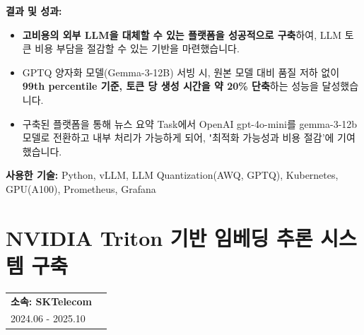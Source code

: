 \documentclass[letterpaper,11pt]{article}
\makeatletter
\newcommand{\resumeProject}[2]{
  \vspace{-1pt}\item
    \begin{tabular*}{0.97\textwidth}[t]{l@{\extracolsep{\fill}}r}
      \textbf{#1} \\
      \small{#2} \\
    \end{tabular*}\vspace{-5pt}
}
\makeatother
\begin{document}
{      %
      \textbf{결과 및 성과:}
      \begin{itemize}[leftmargin=*]
          \item \textbf{고비용의 외부 LLM을 대체할 수 있는 플랫폼을 성공적으로 구축}하여, LLM 토큰 비용 부담을 절감할 수 있는 기반을 마련했습니다.
          \item GPTQ 양자화 모델(Gemma-3-12B) 서빙 시, 원본 모델 대비 품질 저하 없이 \textbf{99th percentile 기준, 토큰 당 생성 시간을 약 20\% 단축}하는 성능을 달성했습니다.
          \item 구축된 플랫폼을 통해 뉴스 요약 Task에서 OpenAI gpt-4o-mini를 gemma-3-12b 모델로 전환하고 내부 처리가 가능하게 되어, \textbf'최적화 가능성과 비용 절감'에 기여했습니다.
      \end{itemize}

      \textbf{사용한 기술:} Python, vLLM, LLM Quantization(AWQ, GPTQ), Kubernetes, GPU(A100), Prometheus, Grafana
    }

  \resumeProjectListEnd

\section{\textbf{NVIDIA Triton 기반 임베딩 추론 시스템 구축}}
  \resumeProjectListStart
    \resumeProject
    {\textbf{소속}: SKTelecom} {2024.06 - 2025.10}
\end{document}
